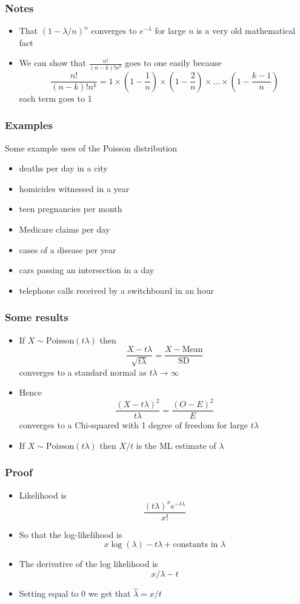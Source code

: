 \documentclass[aspectratio=169]{beamer}
\begin{document}
 \begin{frame}\frametitle{Notes}
 \begin{itemize}
 \item That $(1 - \lambda/n)^n$ converges to $e^{-\lambda}$ for large $n$ is 
   a very old mathematical fact
 \item We can show that $\frac{n!}{(n-k)!n^k}$ goes to one easily because
   $$
   \frac{n!}{(n-k)!n^k} = 1 \times \left(1 - \frac{1}{n}\right) \times \left(1 - \frac{2}{n}\right) \times \ldots
   \times \left(1 - \frac{k - 1}{n}\right)
   $$
   each term goes to 1
\end{itemize}
\end{frame}

\begin{frame}\frametitle{Examples}
Some example uses of the Poisson distribution
\begin{itemize}
\item deaths per day in a city 
\item homicides witnessed in a year
\item teen pregnancies per month
\item Medicare claims per day
\item cases of a disease per year
\item cars passing an intersection in a day
\item telephone calls received by a switchboard in an hour
\end{itemize}
\end{frame}

\begin{frame}\frametitle{Some results}
\begin{itemize}
\item If $X \sim \mbox{Poisson}(t\lambda)$ then 
$$
\frac{X - t\lambda}{\sqrt{t\lambda}} = \frac{X - \mbox{Mean}}{\mbox{SD}} 
$$
converges to a standard normal as $t\lambda \rightarrow \infty$
\item Hence 
$$
\frac{(X - t\lambda)^2}{t\lambda} = \frac{(O - E)^2}{E} 
$$
converges to a Chi-squared with 1 degree of freedom for large $t\lambda$
\item If $X \sim \mbox{Poisson}(t\lambda)$ then $X/t$ is the ML estimate
  of $\lambda$
\end{itemize}
\end{frame}

\begin{frame}\frametitle{Proof}
\begin{itemize}
\item Likelihood is
$$
\frac{(t\lambda)^x e^{-t\lambda}}{x!}
$$
\item So that the log-likelihood is
$$
x\log(\lambda) - t\lambda + \mbox{constants in } \lambda
$$
\item The derivative of the log likelihood is
$$
x / \lambda - t
$$
\item Setting equal to $0$ we get that $\hat \lambda = x / t$
\end{itemize}
\end{frame}
\end{document}
